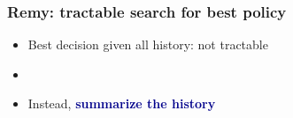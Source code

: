 \documentclass[svgnames]{beamer}
\begin{document}
%
%
%
%
%
%
%
%

\begin{frame}
\frametitle{Remy: tractable search for best policy}

\Large

\begin{itemize}

\item Best decision given all history: not tractable

\item[]

\item Instead, \textbf{\textcolor{DarkBlue}{summarize the history}}

\end{itemize}

\end{frame}
\end{document}
